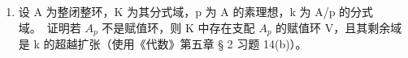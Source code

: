 \begin{enumerate}
\def\labelenumi{\arabic{enumi}.}
\setcounter{enumi}{5}
\tightlist
\item
  设 A 为整闭整环，K 为其分式域，p 为 A 的素理想，k 为 A/p 的分式域。~证明若 \(A_{p}\) 不是赋值环，则 K 中存在支配 \(A_{p}\) 的赋值环 V，且其剩余域是 k 的超越扩张（使用《代数》第五章 § 2 习题 14(b)）。
\end{enumerate}

